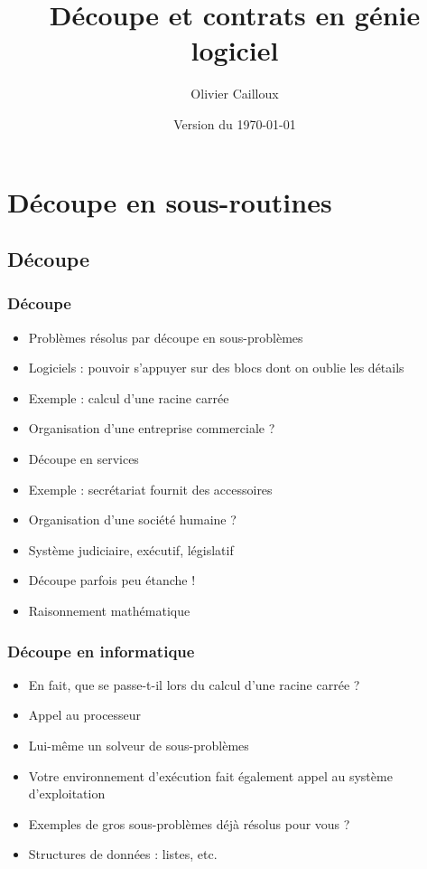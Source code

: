 \documentclass[english, french]{beamer}
\title{Découpe et contrats en génie logiciel}
\subtitle{}
\author{Olivier Cailloux}
\institute[LAMSADE]{LAMSADE, Université Paris-Dauphine}
\date{Version du \today}
\begin{document}


\begin{frame}[plain]
   \titlepage
\end{frame}
\addtocounter{framenumber}{-1}

\section{Découpe en sous-routines}
\subsection{Découpe}
\begin{frame}
	\frametitle{Découpe}
	\begin{itemize}
		\item Problèmes résolus par découpe en sous-problèmes
		\item Logiciels : pouvoir s’appuyer sur des blocs dont on oublie les détails
		\item Exemple : calcul d’une racine carrée
		\item Organisation d’une entreprise commerciale ?
		\item<2-> Découpe en services
		\item<2-> Exemple : secrétariat fournit des accessoires
		\item Organisation d’une société humaine ?
		\item<3-> Système judiciaire, exécutif, législatif
		\item Découpe parfois peu étanche !
		\item Raisonnement mathématique
	\end{itemize}
\end{frame}

\begin{frame}
	\frametitle{Découpe en informatique}
	\begin{itemize}
		\item En fait, que se passe-t-il lors du calcul d’une racine carrée ? \pause
		\item Appel au processeur
		\item Lui-même un solveur de sous-problèmes
		\item Votre environnement d’exécution fait également appel au système d’exploitation
		\item Exemples de gros sous-problèmes déjà résolus pour vous ? \pause
		\item Structures de données : listes, etc.
	\end{itemize}
\end{frame}
\end{document}
